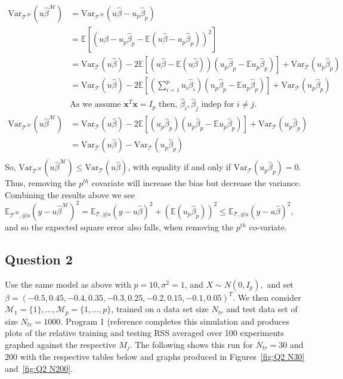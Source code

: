 \documentclass{article}
\begin{document}
\begin{equation*}
\begin{split}
\text{Var}_{\mathcal{T}^\mathcal{M}}(u\hat{\beta}^\mathcal{M}) &= \text{Var}_{\mathcal{T}^\mathcal{M}}(u\hat{\beta}- u_p\hat{\beta}_p) \\
&= \mathbb{E}\left[\left(u\hat{\beta}-u_p \hat{\beta}_p-\mathbb{E}(u\hat{\beta}-u_p \hat{\beta}_p)\right)^2 \right] \\
&= \text{Var}_{\mathcal{T}}(u\hat{\beta})-2\mathbb{E}\left[(u\hat{\beta}-\mathbb{E}(u\hat{\beta}))(u_p \hat{\beta}_p-\mathbb{E}u_p \hat{\beta}_p) \right] + \text{Var}_{\mathcal{T}}(u_p \hat{\beta}_p) \\
&= \text{Var}_{\mathcal{T}}(u\hat{\beta})-2\mathbb{E}\left[ \left(\sum_{i=1}^p u_i \hat{\beta}_i \right) \left(u_p \hat{\beta}_p-\mathbb{E}u_p \hat{\beta}_p \right) \right] + \text{Var}_{\mathcal{T}}(u_p \hat{\beta}_p) \\
&\text{As we assume } \textbf{x}^T\textbf{x}=I_p \text{ then, } \hat{\beta}_i, \hat{\beta}_j \text{ indep for } i \neq j. \\
\text{Var}_{\mathcal{T}^\mathcal{M}}(u\hat{\beta}^\mathcal{M}) &= \text{Var}_{\mathcal{T}}(u\hat{\beta})-2\mathbb{E}\left[(u_p \hat{\beta}_p)(u_p \hat{\beta}_p-\mathbb{E}u_p \hat{\beta}_p) \right] + \text{Var}_{\mathcal{T}}(u_p \hat{\beta}_p) \\
&= \text{Var}_{\mathcal{T}}(u\hat{\beta})- \text{Var}_{\mathcal{T}}(u_p \hat{\beta}_p) \\
\end{split}
\end{equation*}
So, $\text{Var}_{\mathcal{T}^\mathcal{M}}(u\hat{\beta}^\mathcal{M}) \leq \text{Var}_{\mathcal{T}}(u\hat{\beta})$, with equality if and only if $\text{Var}_{\mathcal{T}}(u_p \hat{\beta}_p)=0$. Thus, removing the $p^{th}$ covariate will increase the bias but decrease the variance. Combining the results above we see $\mathbb{E}_{\mathcal{T}^\mathcal{M},y|u}(y-u\hat{\beta}^\mathcal{M})^2 = \mathbb{E}_{\mathcal{T},y|u}(y-u\hat{\beta})^2+ \left (\mathbb{E}(u_p\hat{\beta}_p) \right)^2 \leq \mathbb{E}_{\mathcal{T},y|u}(y-u\hat{\beta})^2$, and so the expected square error also falls, when removing the $p^{th}$ co-variate.

\subsection{Question 2}
Use the same model as above with $p=10, \sigma^2=1$, and $X \sim N(0,I_p),$ and set $\beta = (-0.5,0.45,-0.4,0.35,-0.3,0.25,-0.2,0.15,-0.1,0.05)^T$. We then consider $\mathcal{M}_1=\{1\},...,\mathcal{M}_p=\{1,...,p\}$, trained on a data set size $N_{tr}$ and test data set of size $N_{te}=1000$. Program 1 (reference completes this simulation and produces plots of the relative training and testing RSS averaged over 100 experiments graphed against the respective $M_j$. The following shows this run for $N_{tr}=30$ and $200$ with the respective tables below and graphs produced in Figures~\ref{fig:Q2 N30} and~\ref{fig:Q2 N200}.
\end{document}
